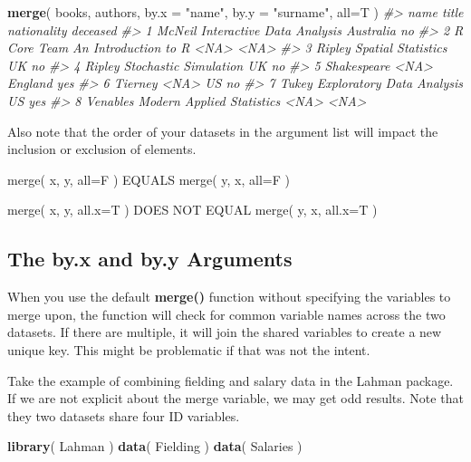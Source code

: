 \documentclass[]{book}
\newenvironment{Shaded}{\begin{snugshade}}{\end{snugshade}}
\newcommand{\CommentTok}[1]{\textcolor[rgb]{0.56,0.35,0.01}{\textit{#1}}}
\newcommand{\DataTypeTok}[1]{\textcolor[rgb]{0.13,0.29,0.53}{#1}}
\newcommand{\KeywordTok}[1]{\textcolor[rgb]{0.13,0.29,0.53}{\textbf{#1}}}
\newcommand{\NormalTok}[1]{#1}
\newcommand{\StringTok}[1]{\textcolor[rgb]{0.31,0.60,0.02}{#1}}
\theoremstyle{definition}
\theoremstyle{definition}
\theoremstyle{definition}
\theoremstyle{remark}
\begin{document}
\begin{Shaded}
\begin{Highlighting}[]
\KeywordTok{merge}\NormalTok{( books, authors, }\DataTypeTok{by.x =} \StringTok{"name"}\NormalTok{, }\DataTypeTok{by.y =} \StringTok{"surname"}\NormalTok{, }\DataTypeTok{all=}\NormalTok{T )   }
\CommentTok{#>          name                     title nationality deceased}
\CommentTok{#> 1      McNeil Interactive Data Analysis   Australia       no}
\CommentTok{#> 2 R Core Team      An Introduction to R        <NA>     <NA>}
\CommentTok{#> 3      Ripley        Spatial Statistics          UK       no}
\CommentTok{#> 4      Ripley     Stochastic Simulation          UK       no}
\CommentTok{#> 5 Shakespeare                      <NA>     England      yes}
\CommentTok{#> 6     Tierney                      <NA>          US       no}
\CommentTok{#> 7       Tukey Exploratory Data Analysis          US      yes}
\CommentTok{#> 8    Venables Modern Applied Statistics        <NA>     <NA>}
\end{Highlighting}
\end{Shaded}

Also note that the order of your datasets in the argument list will
impact the inclusion or exclusion of elements.

merge( x, y, all=F ) EQUALS merge( y, x, all=F )

merge( x, y, all.x=T ) DOES NOT EQUAL merge( y, x, all.x=T )

\hypertarget{the-by.x-and-by.y-arguments}{%
\subsection{The by.x and by.y
Arguments}\label{the-by.x-and-by.y-arguments}}

When you use the default \textbf{merge()} function without specifying
the variables to merge upon, the function will check for common variable
names across the two datasets. If there are multiple, it will join the
shared variables to create a new unique key. This might be problematic
if that was not the intent.

Take the example of combining fielding and salary data in the Lahman
package. If we are not explicit about the merge variable, we may get odd
results. Note that they two datasets share four ID variables.

\begin{Shaded}
\begin{Highlighting}[]

\KeywordTok{library}\NormalTok{( Lahman )}
\KeywordTok{data}\NormalTok{( Fielding )}
\KeywordTok{data}\NormalTok{( Salaries )}
\end{Highlighting}
\end{Shaded}
\end{document}
